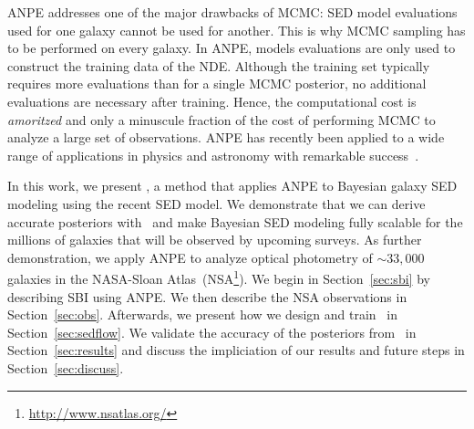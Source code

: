 ANPE addresses one of the major drawbacks of MCMC: SED model evaluations used
for one galaxy cannot be used for another.
This is why MCMC sampling has to be performed on every galaxy. 
In ANPE, models evaluations are only used to construct the training data of the
NDE. 
Although the training set typically requires more evaluations than for a single
MCMC posterior, no additional evaluations are necessary after training. 
Hence, the computational cost is \emph{amoritzed} and only a minuscule
fraction of the cost of performing MCMC to analyze a large set of observations.
ANPE has recently been applied to a wide range of applications in physics and
astronomy with remarkable success~\citep{stein2020, wong2020, dax2021,
zhang2021}.

In this work, we present \sedflow, a method that applies ANPE to Bayesian
galaxy SED modeling using the recent \cite{hahn2022} SED model. 
We demonstrate that we can derive accurate posteriors with \sedflow~and make
Bayesian SED modeling fully scalable for the millions of galaxies that will be
observed by upcoming surveys.
As further demonstration, we apply ANPE to analyze optical photometry of
${\sim}33,000$ galaxies in the NASA-Sloan
Atlas~(NSA\footnote{\url{http://www.nsatlas.org/}}). 
We begin in Section~\ref{sec:sbi} by describing SBI using ANPE.
We then describe the NSA observations in Section~\ref{sec:obs}. 
Afterwards, we present how we design and train \sedflow~in
Section~\ref{sec:sedflow}. 
We validate the accuracy of the posteriors from \sedflow~in
Section~\ref{sec:results} and discuss the impliciation of our results and
future steps in Section~\ref{sec:discuss}. 
